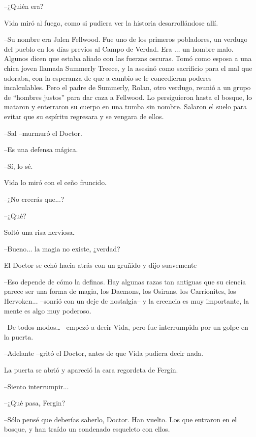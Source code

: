 --¿Quién era?

Vida miró al fuego, como si pudiera ver la historia desarrollándose allí. 

--Su nombre era Jalen Fellwood. Fue uno de los primeros pobladores, un verdugo del pueblo en los días previos al Campo de Verdad. Era ... un hombre malo. Algunos dicen que estaba aliado con las fuerzas oscuras. Tomó como esposa a una chica joven llamada Summerly Treece, y la asesinó como sacrificio para el mal que adoraba, con la esperanza de que a cambio se le concedieran poderes incalculables. Pero el padre de Summerly, Rolan, otro verdugo, reunió a un grupo de ``hombres justos'' para dar caza a Fellwood. Lo persiguieron hasta el bosque, lo mataron y enterraron su cuerpo en una tumba sin nombre. Salaron el suelo para evitar que su espíritu regresara y se vengara de ellos.

--Sal --murmuró el Doctor.

--Es una defensa mágica.

--Sí, lo sé.

Vida lo miró con el ceño fruncido. 

--¿No creerás que...?

--¿Qué?

Soltó una risa nerviosa. 

--Bueno... la magia no existe, ¿verdad?

El Doctor se echó hacia atrás con un gruñido y dijo suavemente 

--Eso depende de cómo la definas. Hay algunas razas tan antiguas que su ciencia parece ser una forma de magia, los Daemons, los Osirans, los Carrionites, los Hervoken... --sonrió con un deje de nostalgia-- y la creencia es muy importante, la mente es algo muy poderoso.

--De todos modos… --empezó a decir Vida, pero fue interrumpida por un golpe en la puerta.

--Adelante --gritó el Doctor, antes de que Vida pudiera decir nada.

La puerta se abrió y apareció la cara regordeta de Fergin.

--Siento interrumpir...

--¿Qué pasa, Fergin?

--Sólo pensé que deberías saberlo, Doctor. Han vuelto. Los que entraron en el bosque, y han traído un condenado esqueleto con ellos.



\mbox{}



